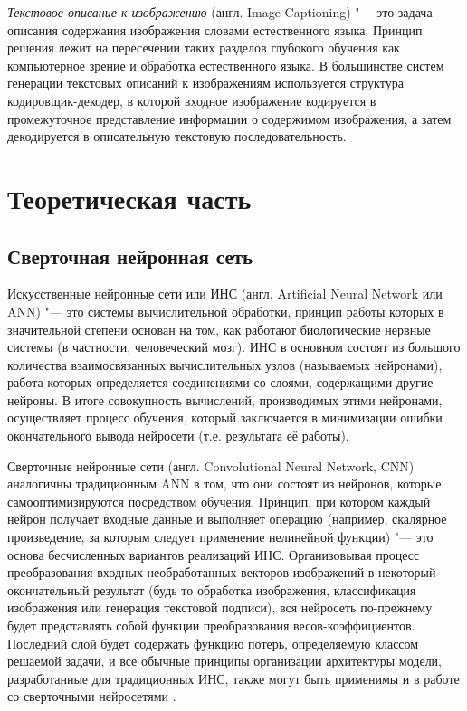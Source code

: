 \documentclass[bachelor, och, coursework]{SCWorks}
\begin{document}
    \textit{Текстовое описание к изображению} (англ. Image Captioning) "--- это
    задача описания содержания изображения словами естественного языка. Принцип
    решения лежит на пересечении таких разделов глубокого обучения как
    компьютерное зрение и обработка естественного языка. В большинстве систем
    генерации текстовых описаний к изображениям используется структура
    кодировщик-декодер, в которой входное изображение кодируется в промежуточное
    представление информации о содержимом изображения, а затем декодируется в
    описательную текстовую последовательность.

\section{Теоретическая часть}

    \subsection{Сверточная нейронная сеть}

        Искусственные нейронные сети или ИНС (англ. Artificial Neural Network
        или ANN) "--- это системы вычислительной обработки, принцип работы
        которых в значительной степени основан на том, как работают
        биологические нервные системы (в частности, человеческий мозг). ИНС в
        основном состоят из большого количества взаимосвязанных вычислительных
        узлов (называемых нейронами), работа которых определяется соединениями
        со слоями, содержащими другие нейроны. В итоге совокупность вычислений,
        производимых этими нейронами, осуществляет процесс обучения, который
        заключается в минимизации ошибки окончательного вывода нейросети (т.е.
        результата её работы).
        
        Сверточные нейронные сети (англ. Convolutional Neural Network, CNN)
        аналогичны традиционным ANN в том, что они состоят из нейронов, которые
        самооптимизируются посредством обучения. Принцип, при котором каждый
        нейрон получает входные данные и выполняет операцию (например, скалярное
        произведение, за которым следует применение нелинейной функции) "--- это
        основа бесчисленных вариантов реализаций ИНС. Организовывая процесс
        преобразования входных необработанных векторов изображений в некоторый
        окончательный результат (будь то обработка изображения, классификация
        изображения или генерация текстовой подписи), вся нейросеть по-прежнему
        будет представлять собой функции преобразования весов-коэффициентов.
        Последний слой будет содержать функцию потерь, определяемую классом
        решаемой задачи, и все обычные принципы организации архитектуры модели,
        разработанные для традиционных ИНС, также могут быть применимы и в
        работе со сверточными нейросетями \cite{cnn1}. 
\end{document}
